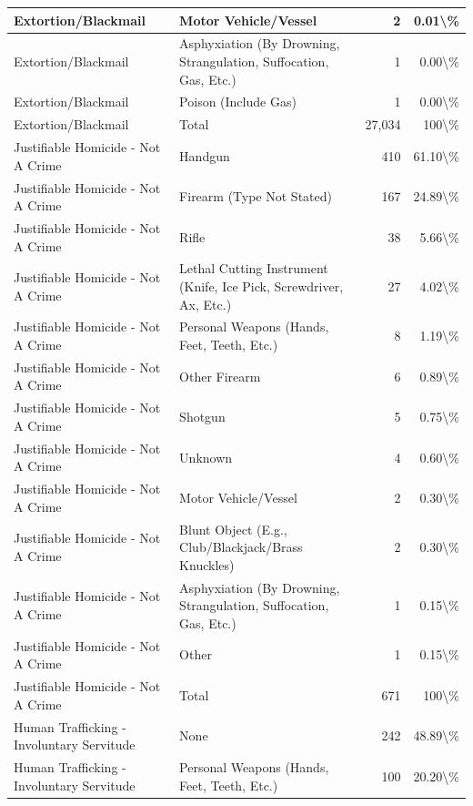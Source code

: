 \documentclass[
]{krantz}
\begin{document}
\begin{longtable}[t]{l|l|r|r}
\hline
Extortion/Blackmail & Motor Vehicle/Vessel & 2 & 0.01\textbackslash{}\%\\
\hline
Extortion/Blackmail & Asphyxiation (By Drowning, Strangulation, Suffocation, Gas, Etc.) & 1 & 0.00\textbackslash{}\%\\
\hline
Extortion/Blackmail & Poison (Include Gas) & 1 & 0.00\textbackslash{}\%\\
\hline
Extortion/Blackmail & Total & 27,034 & 100\textbackslash{}\%\\
\hline
Justifiable Homicide - Not A Crime & Handgun & 410 & 61.10\textbackslash{}\%\\
\hline
Justifiable Homicide - Not A Crime & Firearm (Type Not Stated) & 167 & 24.89\textbackslash{}\%\\
\hline
Justifiable Homicide - Not A Crime & Rifle & 38 & 5.66\textbackslash{}\%\\
\hline
Justifiable Homicide - Not A Crime & Lethal Cutting Instrument (Knife, Ice Pick, Screwdriver, Ax, Etc.) & 27 & 4.02\textbackslash{}\%\\
\hline
Justifiable Homicide - Not A Crime & Personal Weapons (Hands, Feet, Teeth, Etc.) & 8 & 1.19\textbackslash{}\%\\
\hline
Justifiable Homicide - Not A Crime & Other Firearm & 6 & 0.89\textbackslash{}\%\\
\hline
Justifiable Homicide - Not A Crime & Shotgun & 5 & 0.75\textbackslash{}\%\\
\hline
Justifiable Homicide - Not A Crime & Unknown & 4 & 0.60\textbackslash{}\%\\
\hline
Justifiable Homicide - Not A Crime & Motor Vehicle/Vessel & 2 & 0.30\textbackslash{}\%\\
\hline
Justifiable Homicide - Not A Crime & Blunt Object (E.g., Club/Blackjack/Brass Knuckles) & 2 & 0.30\textbackslash{}\%\\
\hline
Justifiable Homicide - Not A Crime & Asphyxiation (By Drowning, Strangulation, Suffocation, Gas, Etc.) & 1 & 0.15\textbackslash{}\%\\
\hline
Justifiable Homicide - Not A Crime & Other & 1 & 0.15\textbackslash{}\%\\
\hline
Justifiable Homicide - Not A Crime & Total & 671 & 100\textbackslash{}\%\\
\hline
Human Trafficking - Involuntary Servitude & None & 242 & 48.89\textbackslash{}\%\\
\hline
Human Trafficking - Involuntary Servitude & Personal Weapons (Hands, Feet, Teeth, Etc.) & 100 & 20.20\textbackslash{}\%\\

\end{longtable}
\end{document}
